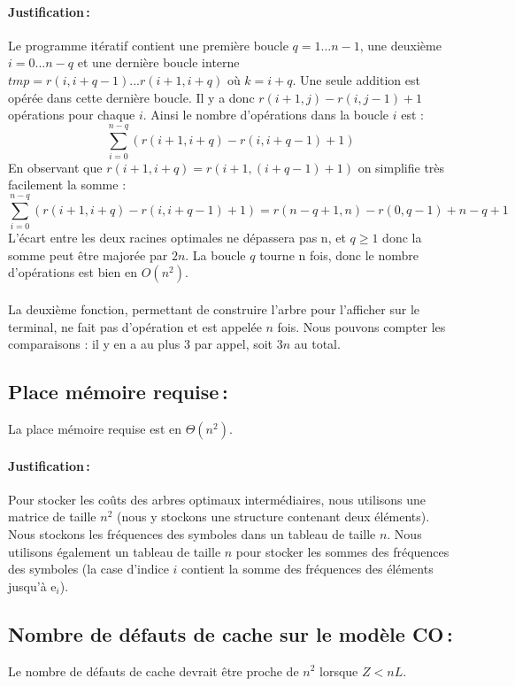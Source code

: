 \documentclass[a4paper, 10pt, french]{article}
\begin{document}
    \paragraph{Justification\,: }
    Le programme itératif contient une première boucle $ q = 1 ... n-1 $, une deuxième $ i = 0 ... n-q $ et une dernière boucle interne $ tmp = r(i, i+q-1) ... r(i+1, i+q)$ où $k = i + q$. Une seule addition est opérée dans cette dernière boucle. Il y a donc $r(i+1, j) - r(i, j-1) + 1$ opérations pour chaque $i$. Ainsi le nombre d'opérations dans la boucle $i$ est :  
   $$ \sum_{i = 0}^{n - q} (r(i+1, i+q) - r(i, i+q-1) + 1)$$
    En observant que $r(i+1, i+q) = r(i+1, (i+q-1)+1)$ on simplifie très facilement la somme : 
    $$ \sum_{i = 0}^{n - q} (r(i+1, i+q) - r(i, i+q-1) + 1) = r(n-q+1, n) - r(0, q-1) + n - q + 1$$
    L'écart entre les deux racines optimales ne dépassera pas n, et $q \geq 1$ donc la somme peut être majorée par $2n$. La boucle $q$ tourne n fois, donc le nombre d'opérations est bien en $O(n^2)$.\\ \\
    La deuxième fonction, permettant de construire l'arbre pour l'afficher sur le terminal, ne fait pas d'opération et est appelée $n$ fois. Nous pouvons compter les comparaisons : il y en a au plus 3 par appel, soit $3n$ au total.
    
  \subsection{Place mémoire requise\,: }
  La place mémoire requise est en $\Theta(n^2)$.
    \paragraph{Justification\,: }
Pour stocker les coûts des arbres optimaux intermédiaires, nous utilisons une matrice de taille $n^2$ (nous y stockons une structure contenant deux éléments). Nous stockons les fréquences des symboles dans un tableau de taille $n$. Nous utilisons également un tableau de taille $n$ pour stocker les sommes des fréquences des symboles (la case d'indice $i$ contient la somme des fréquences des éléments jusqu'à e$_i$).\\
  \subsection{Nombre de défauts de cache sur le modèle CO\,: }
  Le nombre de défauts de cache devrait être proche de $n^2$ lorsque $Z < nL$.
\end{document}
